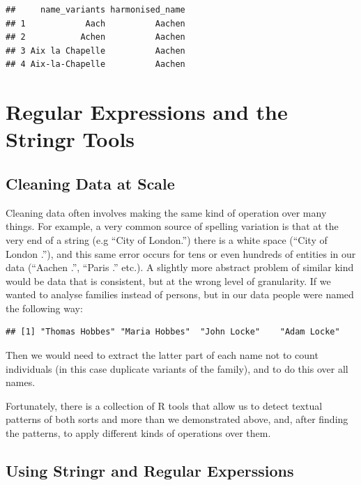 \documentclass[
]{book}
\begin{document}
\begin{verbatim}
##     name_variants harmonised_name
## 1            Aach          Aachen
## 2           Achen          Aachen
## 3 Aix la Chapelle          Aachen
## 4 Aix-la-Chapelle          Aachen
\end{verbatim}

\hypertarget{regular-expressions-and-the-stringr-tools}{%
\section{Regular Expressions and the Stringr Tools}\label{regular-expressions-and-the-stringr-tools}}

\hypertarget{cleaning-data-at-scale}{%
\subsection{Cleaning Data at Scale}\label{cleaning-data-at-scale}}

Cleaning data often involves making the same kind of operation over many things. For example, a very common source of spelling variation
is that at the very end of a string (e.g ``City of London.'') there is a white space (``City of London .''), and this same error occurs for
tens or even hundreds of entities in our data (``Aachen .'', ``Paris .'' etc.). A slightly more abstract problem of similar kind would be data that is consistent, but at the wrong level of granularity. If we wanted to analyse families instead of persons, but in our data people were named the following way:

\begin{verbatim}
## [1] "Thomas Hobbes" "Maria Hobbes"  "John Locke"    "Adam Locke"
\end{verbatim}

Then we would need to extract the latter part of each name not to count individuals (in this case duplicate variants of the family), and
to do this over all names.

Fortunately, there is a collection of R tools that allow us to detect textual patterns of both sorts and more than we demonstrated above,
and, after finding the patterns, to apply different kinds of operations over them.

\hypertarget{using-stringr-and-regular-experssions}{%
\subsection{Using Stringr and Regular Experssions}\label{using-stringr-and-regular-experssions}}
\end{document}
